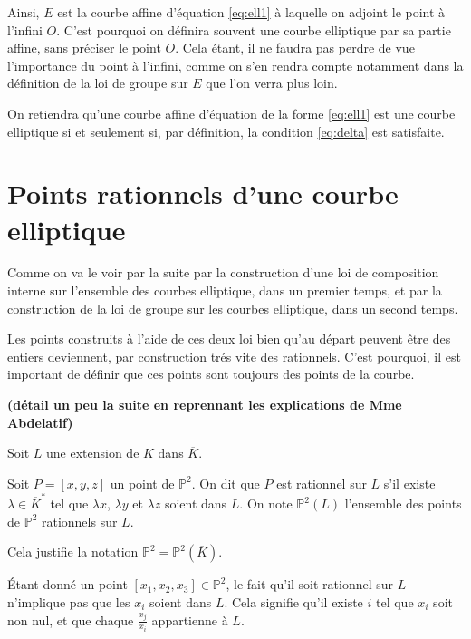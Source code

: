 Ainsi, $E$ est la courbe affine d'équation \eqref{eq:ell1} à laquelle on adjoint le point à l'infini $O$. C'est pourquoi on définira souvent une courbe elliptique par sa partie affine, sans préciser le point $O$. Cela étant, il ne faudra pas perdre de vue l'importance du point à l'infini, comme on s'en rendra compte notamment dans la définition de la loi de groupe sur $E$ que l'on verra plus loin.

\begin{remarque}
    On retiendra qu'une courbe affine d'équation de la forme \eqref{eq:ell1} est une courbe
    elliptique si et seulement si, par définition, la condition \eqref{eq:delta} est satisfaite.
\end{remarque}

\section{Points rationnels d'une courbe elliptique}
Comme on va le voir par la suite par la construction d'une loi de composition interne sur l'ensemble des
courbes elliptique, dans un premier temps, et par la construction de la loi de groupe
sur les courbes elliptique, dans un second temps.

Les points construits à l'aide de ces deux
loi bien qu'au départ peuvent être des entiers deviennent, par construction trés vite des
rationnels. C'est pourquoi, il est important de définir que ces points sont toujours des
points de la courbe.

\textbf{(détail un peu la suite en reprennant les explications de Mme Abdelatif)}

Soit $L$ une extension de $K$ dans $\overline{K}$.

\begin{definition}
    Soit $P=\left[ x,y,z \right] $ un point de $\mathbb{P}^2$. On dit que $P$ est rationnel sur $L$ s'il existe $\lambda \in \overline{K}^{*}$ tel que $\lambda x$, $\lambda y$ et $\lambda z$ soient dans $L$. On note $\mathbb{P}^2(L)$ l'ensemble des points de $\mathbb{P}^2$ rationnels sur $L$.

    Cela justifie la notation $\mathbb{P}^2 = \mathbb{P}^2(\overline{K})$.
\end{definition}

\begin{remarque}
    Étant donné un point $[x_1,x_2,x_3] \in \mathbb{P}^2$, le fait qu'il soit rationnel sur $L$ n'implique pas que les $x_{i}$ soient dans $L$. Cela signifie qu'il existe $i$ tel que $x_{i}$ soit non nul, et que chaque $\frac{x_{j}}{x_{i}}$ appartienne à $L$.
\end{remarque}

